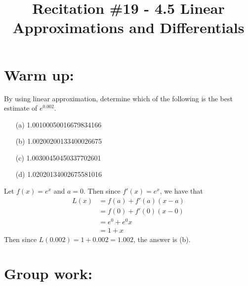 \documentclass[handout,nooutcomes]{ximera}
\title{Recitation \#19 - 4.5 Linear Approximations and Differentials}
\begin{document}
\begin{abstract}		\end{abstract}
\maketitle

\section*{Warm up:} 
By using linear approximation, determine which of the following is the best estimate of $e^{0.002}$.
	\begin{enumerate}
	\item[(a)]  1.00100050016679834166
	\item[(b)]  1.00200200133400026675
	\item[(c)]  1.00300450450337702601
	\item[(d)]  1.02020134002675581016
	\end{enumerate}
	
		\begin{freeResponse}
		Let $f(x) = e^x$ and $a=0$.  Then since $f'(x) = e^x$, we have that
		\begin{align*}
		L(x) &= f(a) + f'(a)(x-a) \\
		&=  f(0) + f'(0)(x-0) \\
		&= e^0 + e^0x \\
		&= 1 + x
		\end{align*}
		Then since $L(0.002) = 1 + 0.002 = 1.002$, the answer is (b).
		\end{freeResponse}	
		
		
		

	
	
	
	
	

\section*{Group work:}
\end{document}
